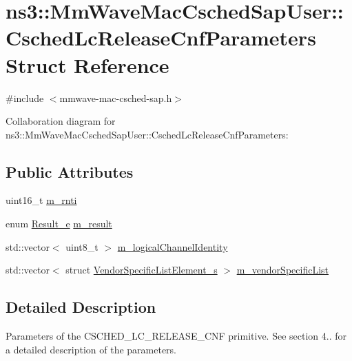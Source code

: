 \hypertarget{structns3_1_1MmWaveMacCschedSapUser_1_1CschedLcReleaseCnfParameters}{}\section{ns3\+:\+:Mm\+Wave\+Mac\+Csched\+Sap\+User\+:\+:Csched\+Lc\+Release\+Cnf\+Parameters Struct Reference}
\label{structns3_1_1MmWaveMacCschedSapUser_1_1CschedLcReleaseCnfParameters}


{\ttfamily \#include $<$mmwave-\/mac-\/csched-\/sap.\+h$>$}



Collaboration diagram for ns3\+:\+:Mm\+Wave\+Mac\+Csched\+Sap\+User\+:\+:Csched\+Lc\+Release\+Cnf\+Parameters\+:
\subsection*{Public Attributes}
\begin{DoxyCompactItemize}
\item 
uint16\+\_\+t \hyperlink{structns3_1_1MmWaveMacCschedSapUser_1_1CschedLcReleaseCnfParameters_a4aadbcc95bbe53096bbb33eabade5756}{m\+\_\+rnti}
\item 
enum \hyperlink{namespacens3_a7acf2b7f9e0781dfe43a6bc54d6ecd07}{Result\+\_\+e} \hyperlink{structns3_1_1MmWaveMacCschedSapUser_1_1CschedLcReleaseCnfParameters_a078dbd24a79b612dcd9a42f10f3bd29f}{m\+\_\+result}
\item 
std\+::vector$<$ uint8\+\_\+t $>$ \hyperlink{structns3_1_1MmWaveMacCschedSapUser_1_1CschedLcReleaseCnfParameters_a491d0c2c3e35aecef6918ee6aefd96dc}{m\+\_\+logical\+Channel\+Identity}
\item 
std\+::vector$<$ struct \hyperlink{structns3_1_1VendorSpecificListElement__s}{Vendor\+Specific\+List\+Element\+\_\+s} $>$ \hyperlink{structns3_1_1MmWaveMacCschedSapUser_1_1CschedLcReleaseCnfParameters_a33dd9a85f828e6da75e6ae1f8ee02f56}{m\+\_\+vendor\+Specific\+List}
\end{DoxyCompactItemize}


\subsection{Detailed Description}
Parameters of the C\+S\+C\+H\+E\+D\+\_\+\+L\+C\+\_\+\+R\+E\+L\+E\+A\+S\+E\+\_\+\+C\+NF primitive. See section 4.. for a detailed description of the parameters. 

